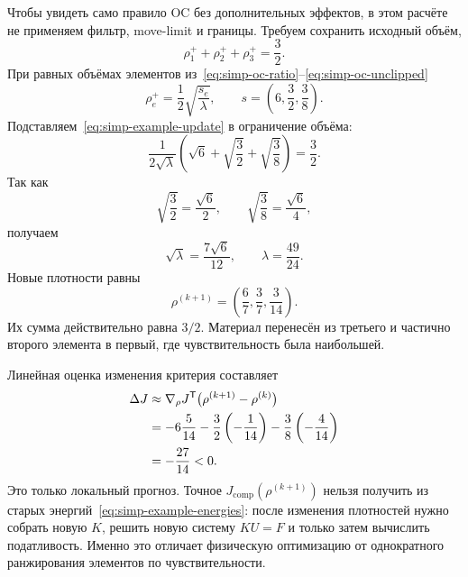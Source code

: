 Чтобы увидеть само правило OC без дополнительных эффектов, в этом расчёте не применяем фильтр, move-limit и границы. Требуем сохранить исходный объём,
\begin{equation}
 \rho_1^++\rho_2^++\rho_3^+
 =
 \frac32.
\end{equation}
При равных объёмах элементов из~\eqref{eq:simp-oc-ratio}--\eqref{eq:simp-oc-unclipped}
\begin{equation}
\label{eq:simp-example-update}
 \rho_e^+
 =
 \frac12
 \sqrt{\frac{s_e}{\lambda}},
 \qquad
 s=\left(6,\frac32,\frac38\right).
\end{equation}
Подставляем~\eqref{eq:simp-example-update} в ограничение объёма:
\begin{equation}
 \frac{1}{2\sqrt\lambda}
 \left(
  \sqrt6+\sqrt{\frac32}+\sqrt{\frac38}
 \right)
 =
 \frac32.
\end{equation}
Так как
\begin{equation}
 \sqrt{\frac32}=\frac{\sqrt6}{2},
 \qquad
 \sqrt{\frac38}=\frac{\sqrt6}{4},
\end{equation}
получаем
\begin{equation}
 \sqrt\lambda
 =
 \frac{7\sqrt6}{12},
 \qquad
 \lambda=\frac{49}{24}.
\end{equation}
Новые плотности равны
\begin{equation}
 \boxed{
 \rho^{(k+1)}
 =
 \left(
  \frac67,
  \frac37,
  \frac3{14}
 \right)
 }.
\end{equation}
Их сумма действительно равна $3/2$. Материал перенесён из третьего и частично второго элемента в первый, где чувствительность была наибольшей.

Линейная оценка изменения критерия составляет
\begin{equation}
 \begin{aligned}
 \Delta J
 &\approx
 \nabla_\rho J^{\mathsf{T}}
 \bigl(\rho^{(k+1)}-\rho^{(k)}\bigr)\\
 &=-6\frac5{14}
   -\frac32\left(-\frac1{14}\right)
   -\frac38\left(-\frac4{14}\right)\\
 &=-\frac{27}{14}<0.
 \end{aligned}
\end{equation}
Это только локальный прогноз. Точное $J_{\mathrm{comp}}(\rho^{(k+1)})$ нельзя получить из старых энергий~\eqref{eq:simp-example-energies}: после изменения плотностей нужно собрать новую $K$, решить новую систему $KU=F$ и только затем вычислить податливость. Именно это отличает физическую оптимизацию от однократного ранжирования элементов по чувствительности.

